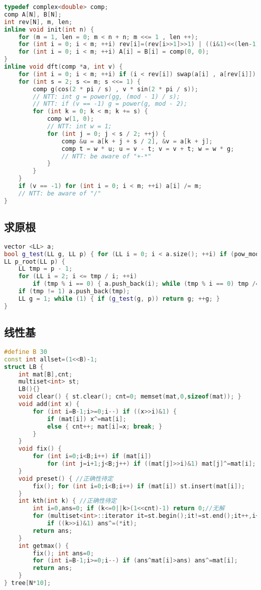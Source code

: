 \documentclass{article}
\begin{document}
\begin{lstlisting}[language=C++]
typedef complex<double> comp;
comp A[N], B[N];
int rev[N], m, len;
inline void init(int n) {
	for (m = 1, len = 0; m < n + n; m <<= 1 , len ++);
	for (int i = 0; i < m; ++i) rev[i]=(rev[i>>1]>>1) | ((i&1)<<(len-1));
	for (int i = 0; i < m; ++i) A[i] = B[i] = comp(0, 0);
}
inline void dft(comp *a, int v) {
	for (int i = 0; i < m; ++i) if (i < rev[i]) swap(a[i] , a[rev[i]]);
	for (int s = 2; s <= m; s <<= 1) {
		comp g(cos(2 * pi / s) , v * sin(2 * pi / s));
		// NTT: int g = power(gg, (mod - 1) / s);
		// NTT: if (v == -1) g = power(g, mod - 2);
		for (int k = 0; k < m; k += s) {
			comp w(1, 0);
			// NTT: int w = 1;
			for (int j = 0; j < s / 2; ++j) {
				comp &u = a[k + j + s / 2], &v = a[k + j];
				comp t = w * u; u = v - t; v = v + t; w = w * g;
				// NTT: be aware of "+-*"
			}
		}
	}
	if (v == -1) for (int i = 0; i < m; ++i) a[i] /= m;
	// NTT: be aware of "/"
}
\end{lstlisting}

\subsection{求原根}
\begin{lstlisting}[language=C++]
vector <LL> a;
bool g_test(LL g, LL p) { for (LL i = 0; i < a.size(); ++i) if (pow_mod(g, (p-1)/a[i], p) == 1) return 0; return 1; }
LL p_root(LL p) {
	LL tmp = p - 1;
	for (LL i = 2; i <= tmp / i; ++i)
		if (tmp % i == 0) { a.push_back(i); while (tmp % i == 0) tmp /= i; }
	if (tmp != 1) a.push_back(tmp);
	LL g = 1; while (1) { if (g_test(g, p)) return g; ++g; }
}
\end{lstlisting}

\subsection{线性基}

\begin{lstlisting}[language=C++]
#define B 30
const int allset=(1<<B)-1;
struct LB {
	int mat[B],cnt;
	multiset<int> st;
	LB(){}
	void clear() { st.clear(); cnt=0; memset(mat,0,sizeof(mat)); }
	void add(int x) {
		for (int i=B-1;i>=0;i--) if ((x>>i)&1) {
		    if (mat[i]) x^=mat[i]; 
		    else { cnt++; mat[i]=x; break; }
		}
	}
	void fix() {
		for (int i=0;i<B;i++) if (mat[i])
		    for (int j=i+1;j<B;j++) if ((mat[j]>>i)&1) mat[j]^=mat[i];
	}
	void preset() { //正确性待定
		fix(); for (int i=0;i<B;i++) if (mat[i]) st.insert(mat[i]);
	}
	int kth(int k) { //正确性待定
		int i=0,ans=0; if (k<=0||k>(1<<cnt)-1) return 0;//无解
		for (multiset<int>::iterator it=st.begin();it!=st.end();it++,i++)
			if ((k>>i)&1) ans^=(*it);
		return ans;
	}
	int getmax() {
		fix(); int ans=0;
		for (int i=B-1;i>=0;i--) if (ans^mat[i]>ans) ans^=mat[i];
		return ans;
	}
} tree[N*10];
\end{lstlisting}
\end{document}
